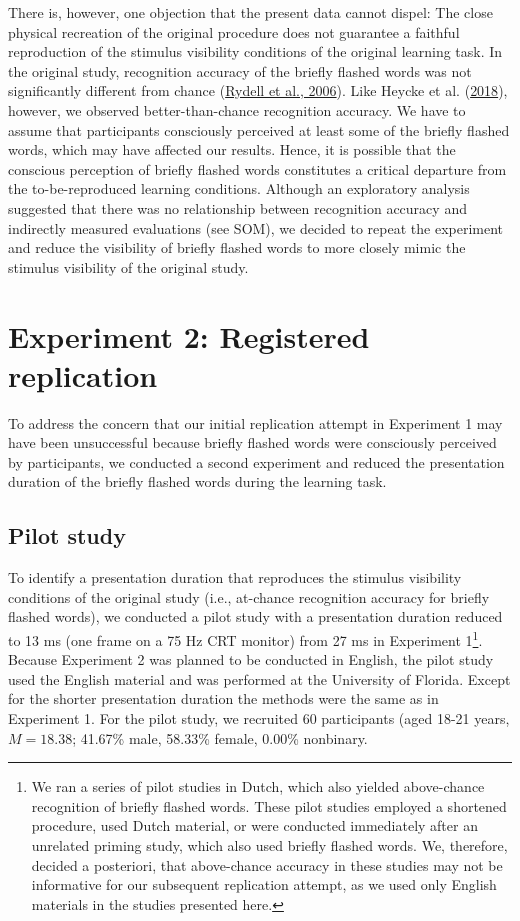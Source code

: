 \documentclass[
  man,floatsintext]{apa6}
\begin{document}
There is, however, one objection that the present data cannot dispel: The close physical recreation of the original procedure does not guarantee a faithful reproduction of the stimulus visibility conditions of the original learning task.
In the original study, recognition accuracy of the briefly flashed words was not significantly different from chance (\protect\hyperlink{ref-rydell_two_2006}{Rydell et al., 2006}).
Like Heycke et al. (\protect\hyperlink{ref-heycke_two_2018}{2018}), however, we observed better-than-chance recognition accuracy.
We have to assume that participants consciously perceived at least some of the briefly flashed words, which may have affected our results.
Hence, it is possible that the conscious perception of briefly flashed words constitutes a critical departure from the to-be-reproduced learning conditions.
Although an exploratory analysis suggested that there was no relationship between recognition accuracy and indirectly measured evaluations (see SOM), we decided to repeat the experiment and reduce the visibility of briefly flashed words to more closely mimic the stimulus visibility of the original study.

\hypertarget{experiment-2-registered-replication}{%
\section{Experiment 2: Registered replication}\label{experiment-2-registered-replication}}

To address the concern that our initial replication attempt in Experiment 1 may have been unsuccessful because briefly flashed words were consciously perceived by participants, we conducted a second experiment and reduced the presentation duration of the briefly flashed words during the learning task.

\hypertarget{pilot-study}{%
\subsection{Pilot study}\label{pilot-study}}

To identify a presentation duration that reproduces the stimulus visibility conditions of the original study (i.e., at-chance recognition accuracy for briefly flashed words), we conducted a pilot study with a presentation duration reduced to 13 ms (one frame on a 75 Hz CRT monitor) from 27 ms in Experiment 1\footnote{We ran a series of pilot studies in Dutch, which also yielded above-chance recognition of briefly flashed words.
  These pilot studies employed a shortened procedure, used Dutch material, or were conducted immediately after an unrelated priming study, which also used briefly flashed words.
  We, therefore, decided a posteriori, that above-chance accuracy in these studies may not be informative for our subsequent replication attempt, as we used only English materials in the studies presented here.}.
Because Experiment 2 was planned to be conducted in English, the pilot study used the English material and was performed at the University of Florida.
Except for the shorter presentation duration the methods were the same as in Experiment 1.
For the pilot study, we recruited 60 participants (aged 18-21 years, \(M = 18.38\); 41.67\% male, 58.33\% female, 0.00\% nonbinary.
\end{document}
